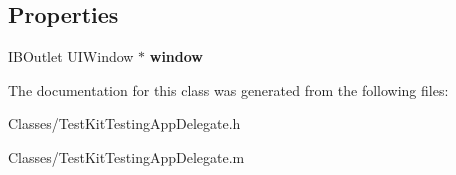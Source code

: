 \subsection*{Properties}
\begin{DoxyCompactItemize}
\item 
\hypertarget{interface_test_kit_testing_app_delegate_a199c6511acf363e0dd027bb0b8f5e115}{
IBOutlet UIWindow $\ast$ {\bfseries window}}
\label{interface_test_kit_testing_app_delegate_a199c6511acf363e0dd027bb0b8f5e115}

\end{DoxyCompactItemize}


The documentation for this class was generated from the following files:\begin{DoxyCompactItemize}
\item 
Classes/TestKitTestingAppDelegate.h\item 
Classes/TestKitTestingAppDelegate.m\end{DoxyCompactItemize}
